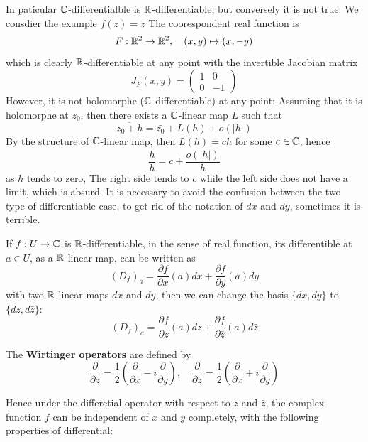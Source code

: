 In paticular \(\mathbb{C}\)-differentialble is \(\mathbb{R}\)-differentiable, but conversely it is not true. We consdier the example \(f(z) = \bar{z}\)
The coorespondent real function is
\[F: \mathbb{R}^2 \to \mathbb{R}^2, \quad (x,y) \mapsto (x,-y)\]
which is clearly \(\mathbb{R}\)-differentiable at any point with the invertible Jacobian matrix
\[J_F(x,y) = \begin{pmatrix}1 & 0 \\ 0 & -1\end{pmatrix}\]
However, it is not holomorphe (\(\mathbb{C}\)-differentiable) at any point: Assuming that it is holomorphe at \(z_0\), then there exists a \(\mathbb{C}\)-linear map \(L\) such that
\[\overline{z_0+h} = \bar{z_0} + L(h) + o(|h|)\]
By the structure of \(\mathbb{C}\)-linear map, then \(L(h)=ch\) for some \(c \in \mathbb{C}\), hence
\[\frac{\bar{h}}{h} = c + \frac{o(|h|)}{h}\]
as \(h\) tends to zero, The right side tends to \(c\) while the left side does not have a limit, which is absurd. It is necessary to avoid the confusion between the two type of differentiable case, to get rid of the notation of \(dx\) and \(dy\), sometimes it is terrible.

If \(f:U \to \mathbb{C}\) is \(\mathbb{R}\)-differentiable, in the sense of real function, its differentible at \(a \in U\), as a \(\mathbb{R}\)-linear map, can be written as
\[(D_f)_a = \frac{\partial f}{\partial x}(a) dx + \frac{\partial f}{\partial y}(a) dy\]
with two \(\mathbb{R}\)-linear maps \(dx\) and \(dy\), then we can change the basis \(\{dx, dy\}\) to \(\{dz, d\bar{z}\}\):
\[(D_f)_a = \frac{\partial f}{\partial z}(a) dz + \frac{\partial f}{\partial \bar{z}}(a) d\bar{z}\]

\begin{definition}
    The \textbf{Wirtinger operators} are defined by
    \[\frac{\partial}{\partial z} = \frac{1}{2}\left(\frac{\partial}{\partial x} - i \frac{\partial}{\partial y}\right), \quad \frac{\partial}{\partial \bar{z}} = \frac{1}{2}\left(\frac{\partial}{\partial x} + i \frac{\partial}{\partial y}\right)\]
\end{definition}

Hence under the differetial operator with respect to \(z\) and \(\bar{z}\), the complex function \(f\) can be independent of \(x\) and \(y\) completely, with the following properties of differential:

